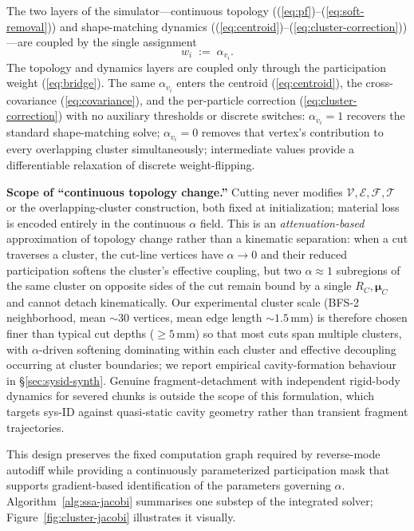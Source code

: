 The two layers of the simulator---continuous topology
((\ref{eq:pf})--(\ref{eq:soft-removal})) and shape-matching dynamics
((\ref{eq:centroid})--(\ref{eq:cluster-correction}))---are coupled by
the single assignment
\begin{equation}
  w_i \;:=\; \alpha_{v_i}.
  \label{eq:bridge}
\end{equation}
The topology and dynamics layers are coupled only through the
participation weight (\ref{eq:bridge}). The same $\alpha_{v_i}$
enters the centroid (\ref{eq:centroid}), the cross-covariance
(\ref{eq:covariance}), and the per-particle correction
(\ref{eq:cluster-correction}) with no auxiliary thresholds or discrete
switches: $\alpha_{v_i} \!=\! 1$ recovers the standard shape-matching
solve; $\alpha_{v_i} \!=\! 0$ removes that vertex's contribution to
every overlapping cluster simultaneously; intermediate values provide
a differentiable relaxation of discrete weight-flipping.

\textbf{Scope of ``continuous topology change.''} Cutting never
modifies $\mathcal{V}, \mathcal{E}, \mathcal{F}, \mathcal{T}$ or the
overlapping-cluster construction, both fixed at initialization;
material loss is encoded entirely in the continuous $\alpha$ field.
This is an \emph{attenuation-based} approximation of topology change
rather than a kinematic separation: when a cut traverses a cluster,
the cut-line vertices have $\alpha \!\to\! 0$ and their reduced
participation softens the cluster's effective coupling, but two
$\alpha \!\approx\! 1$ subregions of the same cluster on opposite
sides of the cut remain bound by a single $R_C, \boldsymbol{\mu}_C$
and cannot detach kinematically. Our experimental cluster scale
(BFS-2 neighborhood, mean $\sim\!30$ vertices, mean edge length
$\sim\!1.5$\,mm) is therefore chosen finer than typical cut depths
($\geq\!5$\,mm) so that most cuts span multiple clusters, with
$\alpha$-driven softening dominating within each cluster and effective
decoupling occurring at cluster boundaries; we report empirical
cavity-formation behaviour in \S\ref{sec:sysid-synth}. Genuine
fragment-detachment with independent rigid-body dynamics for severed
chunks is outside the scope of this formulation, which targets
sys-ID against quasi-static cavity geometry rather than transient
fragment trajectories.

This design preserves the fixed computation graph required by
reverse-mode autodiff while providing a continuously parameterized
participation mask that supports gradient-based identification of the
parameters governing $\alpha$. Algorithm~\ref{alg:ssa-jacobi} summarises
one substep of the integrated solver; Figure~\ref{fig:cluster-jacobi}
illustrates it visually.

